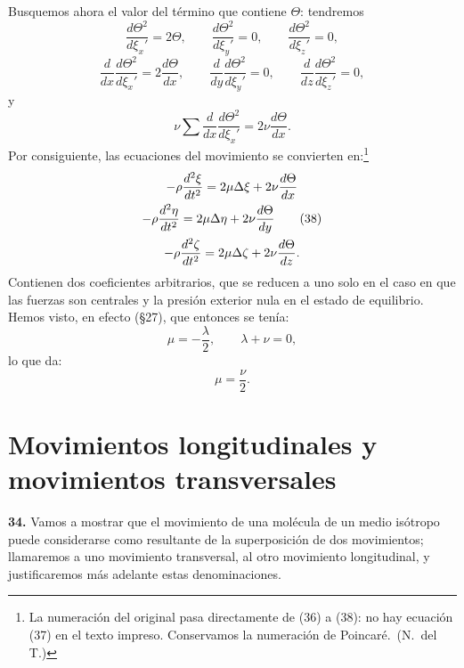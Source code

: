 Busquemos ahora el valor del término que contiene $\Theta$: tendremos
\[
\frac{d\Theta^2}{d\xi_x'}=2\Theta,\qquad \frac{d\Theta^2}{d\xi_y'}=0,\qquad
\frac{d\Theta^2}{d\xi_z'}=0,
\]
\[
\frac{d}{dx}\frac{d\Theta^2}{d\xi_x'}=2\frac{d\Theta}{dx},\qquad
\frac{d}{dy}\frac{d\Theta^2}{d\xi_y'}=0,\qquad \frac{d}{dz}\frac{d\Theta^2}{d\xi_z'}=0,
\]
y
\[
\nu\sum\frac{d}{dx}\frac{d\Theta^2}{d\xi_x'}=2\nu\frac{d\Theta}{dx}.
\]
Por consiguiente, las ecuaciones del movimiento se convierten
en:\footnote{La numeración del original pasa directamente de (36) a (38):
no hay ecuación (37) en el texto impreso. Conservamos la numeración de
Poincaré.~(N.~del T.)}
\begin{gather}
-\rho\frac{d^2\xi}{dt^2}=2\mu\Delta\xi+2\nu\frac{d\Theta}{dx}\notag\\
-\rho\frac{d^2\eta}{dt^2}=2\mu\Delta\eta+2\nu\frac{d\Theta}{dy}
\tag{38}\\
-\rho\frac{d^2\zeta}{dt^2}=2\mu\Delta\zeta+2\nu\frac{d\Theta}{dz}.\notag
\end{gather}
Contienen dos coeficientes arbitrarios, que se reducen a uno solo en el
caso en que las fuerzas son centrales y la presión exterior nula en el
estado de equilibrio. Hemos visto, en efecto (§27), que entonces se tenía:
\[
\mu=-\frac{\lambda}{2},\qquad \lambda+\nu=0,
\]
lo que da:
\[
\mu=\frac{\nu}{2}.
\]

\section{Movimientos longitudinales y movimientos transversales}

\noindent\textbf{34.} Vamos a mostrar que el movimiento de una molécula de
un medio isótropo puede considerarse como resultante de la superposición
de dos movimientos; llamaremos a uno movimiento transversal, al otro
movimiento longitudinal, y justificaremos más adelante estas
denominaciones.

